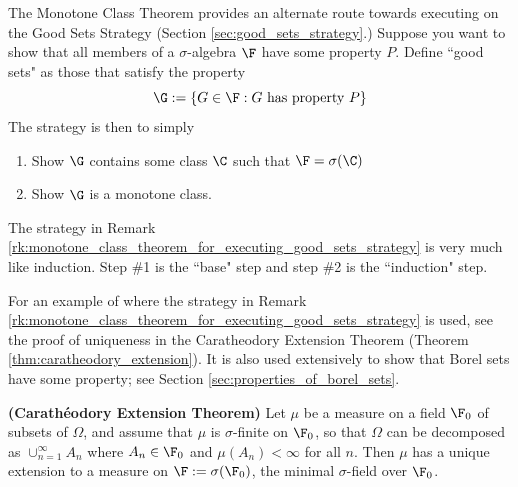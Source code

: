 \documentclass{article} %
\begin{document}
\begin{remark}{}
The Monotone Class Theorem provides an alternate route towards executing on the Good Sets Strategy (Section \ref{sec:good_sets_strategy}.)  Suppose you want to show that all members of a $\sigma$-algebra   $\F$ have some property $P$.  Define ``good sets" as those that satisfy the property
\[ \G := \{ G \in \F : G \text{ has property } P \} \]
The strategy is then to simply
\begin{enumerate}
\item Show $\G$ contains some class $\C$ such that $\F = \sigma(\C)$
\item Show $\G$ is a monotone class.  
\end{enumerate}	 
\label{rk:monotone_class_theorem_for_executing_good_sets_strategy}
\end{remark}

\begin{remark}
The strategy in Remark \ref{rk:monotone_class_theorem_for_executing_good_sets_strategy} is very much like induction.  Step \#1 is the ``base" step and step \#2 is the ``induction" step.
\end{remark}

For an example of where the strategy in Remark \ref{rk:monotone_class_theorem_for_executing_good_sets_strategy} is used, see the proof of uniqueness in the Caratheodory Extension Theorem (Theorem \ref{thm:caratheodory_extension}).  It is also used extensively to show that Borel sets have some property; see Section \ref{sec:properties_of_borel_sets}.


\begin{theorem}{\textbf{(Carath\'eodory Extension Theorem)}} Let $\mu$ be a measure on a field $\F_0$ of subsets of $\Omega$, and assume that $\mu$ is $\sigma$-finite on $\F_0$, so that $\Omega$ can be decomposed as $\cup_{n=1}^\infty A_n$ where $A_n \in \F_0$ and $\mu(A_n) < \infty$ for all $n$.  Then $\mu$ has a unique extension to a measure on $\F := \sigma(\F_0)$, the minimal $\sigma$-field over $\F_0$. 
 \label{thm:caratheodory_extension}
\end{theorem}
\end{document}
